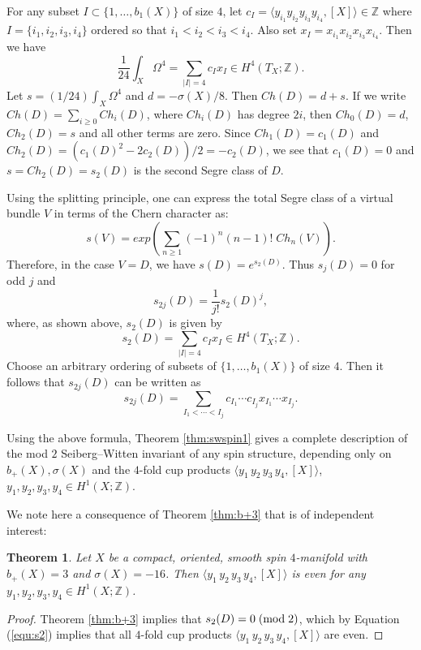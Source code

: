 \documentclass{amsart}
\newtheorem{theorem}{Theorem}[section]
\theoremstyle{definition}
\theoremstyle{remark}
\numberwithin{equation}{section}
\begin{document}
For any subset $I \subset \{1,\dots , b_1(X)\}$ of size $4$, let $c_I = \langle y_{i_1}y_{i_2} y_{i_3} y_{i_4} , [X] \rangle \in \mathbb{Z}$ where $I = \{ i_1 , i_2 , i_3 , i_4 \}$ ordered so that $i_1 < i_2 < i_3 < i_4$. Also set $x_I = x_{i_1}x_{i_2}x_{i_3}x_{i_4}$. Then we have
\[
\frac{1}{24} \int_X \Omega^4 = \sum_{|I|=4} c_I x_I \in H^4(T_X ; \mathbb{Z}).
\]
Let $s = (1/24) \int_X \Omega^4$ and $d = -\sigma(X)/8$. Then $Ch(D) = d + s$. If we write $Ch(D) = \sum_{i \ge 0} Ch_i(D)$, where $Ch_i(D)$ has degree $2i$, then $Ch_0(D) = d$, $Ch_2(D) = s$ and all other terms are zero. Since $Ch_1(D) = c_1(D)$ and $Ch_2(D) = (c_1(D)^2 - 2c_2(D))/2 = -c_2(D)$, we see that $c_1(D) = 0$ and $s = Ch_2(D) = s_2(D)$ is the second Segre class of $D$.

Using the splitting principle, one can express the total Segre class of a virtual bundle $V$ in terms of the Chern character as:
\[
s(V) = exp\left( \sum_{n \ge 1} (-1)^n (n-1)! \; Ch_n(V) \right).
\]
Therefore, in the case $V = D$, we have $s(D) = e^{s_2(D)}$. Thus $s_j(D) = 0$ for odd $j$ and
\[
s_{2j}(D) = \frac{1}{j!} s_2(D)^j,
\]
where, as shown above, $s_2(D)$ is given by
\begin{equation}\label{equ:s2}
s_2(D) = \sum_{|I|=4} c_I x_I \in H^4(T_X ; \mathbb{Z}).
\end{equation}
Choose an arbitrary ordering of subsets of $\{1 , \dots , b_1(X)\}$ of size $4$. Then it follows that $s_{2j}(D)$ can be written as
\[
s_{2j}(D) = \sum_{I_1 < \cdots < I_j } c_{I_1} \cdots c_{I_j} x_{I_1} \cdots x_{I_j}.
\]

Using the above formula, Theorem \ref{thm:swspin1} gives a complete description of the mod $2$ Seiberg--Witten invariant of any spin structure, depending only on $b_+(X), \sigma(X)$ and the $4$-fold cup products $\langle y_1 \,y_2\, y_3\,  y_4 , [X] \rangle$, $y_1,y_2,y_3,y_4 \in H^1(X ; \mathbb{Z})$.

We note here a consequence of Theorem \ref{thm:b+3} that is of independent interest:

\begin{theorem}\label{thm:cup}
Let $X$ be a compact, oriented, smooth spin $4$-manifold with $b_+(X) = 3$ and $\sigma(X) = -16$. Then $\langle y_1 \,y_2\, y_3\,  y_4 , [X] \rangle$ is even for any $y_1,y_2,y_3,y_4 \in H^1(X ; \mathbb{Z})$.
\end{theorem}
\begin{proof}
Theorem \ref{thm:b+3} implies that $s_2(D) = 0 \; ({\rm mod} \; 2)$, which by Equation (\ref{equ:s2}) implies that all $4$-fold cup products $\langle y_1 \,y_2\, y_3\,  y_4 , [X] \rangle$ are even.
\end{proof}
\end{document}
